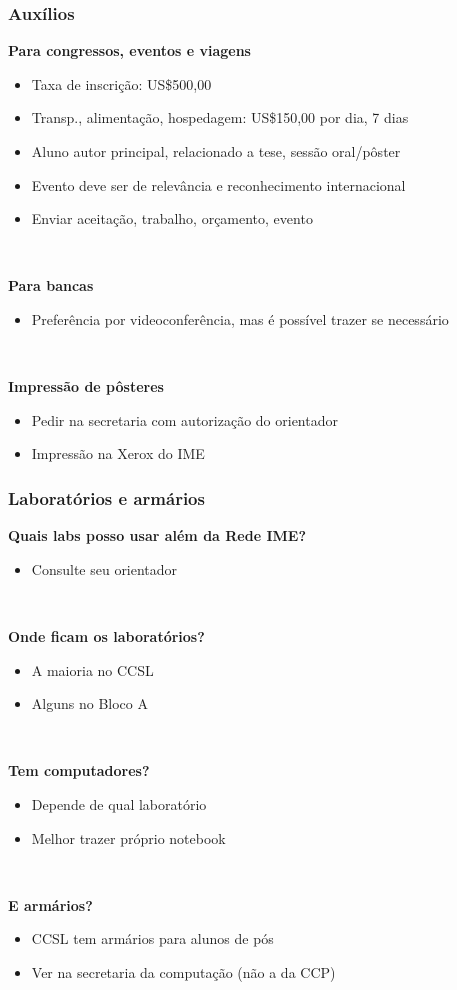 \documentclass{beamer}
\begin{document}
\begin{frame}
  \frametitle{Auxílios}

  \textbf{Para congressos, eventos e viagens}
  \begin{itemize}
    \item Taxa de inscrição: US\$500,00
    \item Transp., alimentação, hospedagem: US\$150,00 por dia, 7 dias
    \item Aluno autor principal, relacionado a tese, sessão oral/pôster
    \item Evento deve ser de relevância e reconhecimento internacional
    \item Enviar aceitação, trabalho, orçamento, evento
  \end{itemize}~\\\pause

  \textbf{Para bancas}
  \begin{itemize}
    \item Preferência por videoconferência, mas é possível trazer se necessário
  \end{itemize}~\\\pause

  \textbf{Impressão de pôsteres}
  \begin{itemize}
    \item Pedir na secretaria com autorização do orientador
    \item Impressão na Xerox do IME
  \end{itemize}
\end{frame}

\begin{frame}
  \frametitle{Laboratórios e armários}

  \textbf{Quais labs posso usar além da Rede IME?}
  \begin{itemize}
    \item Consulte seu orientador
  \end{itemize}~\\\pause

  \textbf{Onde ficam os laboratórios?}
  \begin{itemize}
    \item A maioria no CCSL
    \item Alguns no Bloco A
  \end{itemize}~\\\pause

  \textbf{Tem computadores?}
  \begin{itemize}
    \item Depende de qual laboratório
    \item Melhor trazer próprio notebook
  \end{itemize}~\\\pause

  \textbf{E armários?}
  \begin{itemize}
    \item CCSL tem armários para alunos de pós
    \item Ver na secretaria da computação (não a da CCP)
  \end{itemize}
\end{frame}
\end{document}
